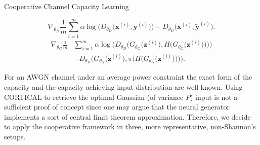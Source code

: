 \begin{algorithm}[t]
\caption{Cooperative Channel Capacity Learning}
\label{alg:CORTICAL_1}
\begin{algorithmic}[1]
	\State {}
	\State {}
        \State {}
        \State {}
        \begin{equation*}
            \nabla_{\theta_D} \frac{1}{m} \sum_{i=1}^{m}{\alpha \log\bigl(D_{\theta_D}\bigl(\mathbf{x}^{(i)},\mathbf{y}^{(i)}\bigr)\bigr)-D_{\theta_D}}\bigl(\mathbf{x}^{(i)},\mathbf{\tilde{y}}^{(i)}\bigr).
        \end{equation*}
\EndFor
    \State {}
    \State {}
        \begin{align*}
            \nabla_{\theta_G} \frac{1}{m} & \sum_{i=1}^{m}{\alpha \log\biggl( D_{\theta_D}\biggl(G_{\theta_G}\bigl(\mathbf{z}^{(i)}\bigr),H\bigl(G_{\theta_G}\bigl(\mathbf{z}^{(i)}\bigr)\bigr)\biggr)\biggr)} \\
            & -D_{\theta_D}\biggl(G_{\theta_G}\bigl(\mathbf{z}^{(i)}\bigr),\pi \bigl(H\bigl(G_{\theta_G}\bigl(\mathbf{z}^{(i)}\bigr)\bigr)\bigr)\biggr).
        \end{align*}
\EndFor
\end{algorithmic}
\end{algorithm}

For an AWGN channel under an average power constraint the exact form of the capacity and the capacity-achieving input distribution are well known. Using CORTICAL to retrieve the optimal Gaussian (of variance $P$) input is not a sufficient proof of concept since one may argue that the neural generator implements a sort of central limit theorem approximation. Therefore, we decide to apply the cooperative framework in three, more representative, non-Shannon's setups.


